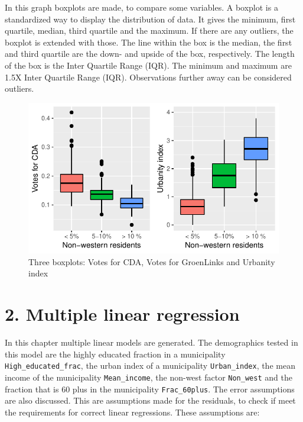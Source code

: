 \documentclass[11pt,]{article}
\begin{document}
In this graph boxplots are made, to compare some variables. A boxplot is
a standardized way to display the distribution of data. It gives the
minimum, first quartile, median, third quartile and the maximum. If
there are any outliers, the boxplot is extended with those. The line
within the box is the median, the first and third quartile are the down-
and upside of the box, respectively. The length of the box is the Inter
Quartile Range (IQR). The minimum and maximum are 1.5X Inter Quartile
Range (IQR). Observations further away can be considered outliers.

\begin{figure}[H]

{\centering \includegraphics{Report_files/figure-latex/unnamed-chunk-7-1} 

}

\caption{\label{6}Three boxplots: Votes for CDA, Votes for GroenLinks and Urbanity index}\label{fig:unnamed-chunk-7}
\end{figure}

\section{2. Multiple linear
regression}\label{multiple-linear-regression}

In this chapter multiple linear models are generated. The demographics
tested in this model are the highly educated fraction in a municipality
\texttt{High\_educated\_frac}, the urban index of a municipality
\texttt{Urban\_index}, the mean income of the municipality
\texttt{Mean\_income}, the non-west factor \texttt{Non\_west} and the
fraction that is 60 plus in the municipality \texttt{Frac\_60plus}. The
error assumptions are also discussed. This are assumptions made for the
residuals, to check if meet the requirements for correct linear
regressions. These assumptions are:
\end{document}
